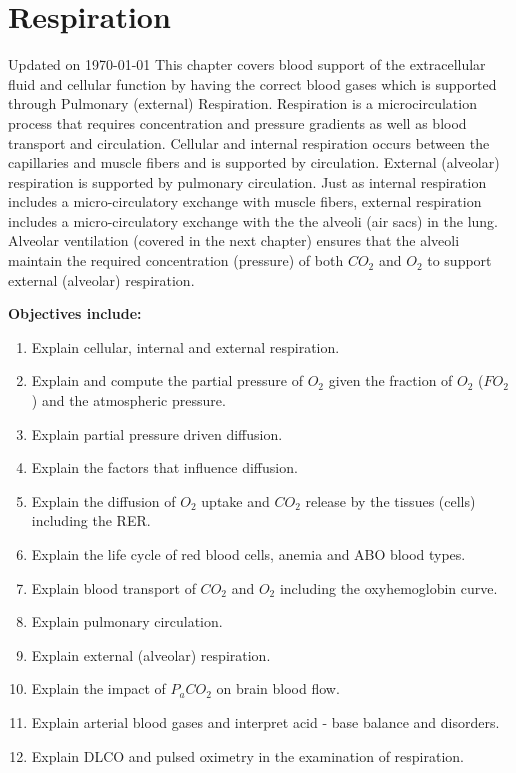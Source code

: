 \chapter{Respiration}\label{chp:respiration}
Updated on \today
\minitoc
This chapter covers blood support of the extracellular fluid and cellular function by having the correct blood gases which is supported through Pulmonary (external) Respiration. Respiration is a microcirculation process that requires concentration and pressure gradients as well as blood transport and circulation. Cellular and internal respiration occurs between the capillaries and muscle fibers and is supported by circulation. External (alveolar) respiration is supported by pulmonary circulation. Just as internal respiration includes a micro-circulatory exchange with muscle fibers, external respiration includes a micro-circulatory exchange with the the alveoli (air sacs) in the lung. Alveolar ventilation (covered in the next chapter) ensures that the alveoli maintain the required concentration (pressure) of both $CO_2$ and $O_2$ to support external (alveolar) respiration.

\vspace{5mm}

\textbf{Objectives include:}
\begin{enumerate}
    \item Explain cellular, internal and external respiration.
    \item Explain and compute the partial pressure of $O_2$ given the fraction of $O_2$ ($FO_2$) and the atmospheric pressure.
    \item Explain partial pressure driven diffusion.
    \item Explain the factors that influence diffusion.
    \item Explain the diffusion of $O_2$ uptake and $CO_2$ release by the tissues (cells) including the RER.
    \item Explain the life cycle of red blood cells, anemia and ABO blood types.
    \item Explain blood transport of $CO_2$ and $O_2$ including the oxyhemoglobin curve.
    \item Explain pulmonary circulation.
    \item Explain external (alveolar) respiration.
    \item Explain the impact of $P_aCO_2$ on brain blood flow.
    \item Explain arterial blood gases and interpret acid - base balance and disorders.
    \item Explain DLCO and pulsed oximetry in the examination of respiration.
\end{enumerate}

